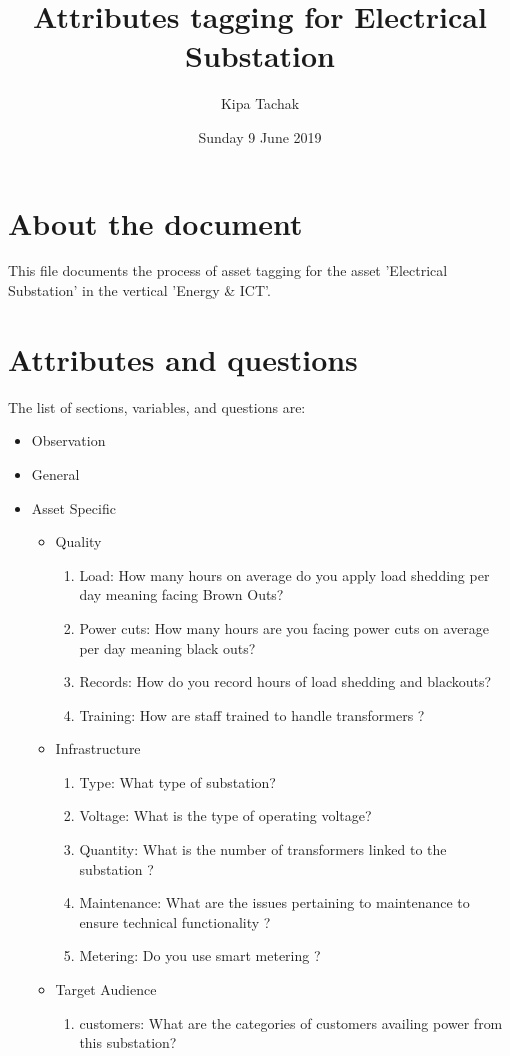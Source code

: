 \documentclass[oneside,twocolumn]{article}
\title{Attributes tagging for Electrical Substation}
\author{Kipa Tachak}
\date{Sunday  9 June 2019}
\begin{document}
\maketitle

\section{About the document}
This file documents the process of asset tagging for the asset 'Electrical Substation' in the
vertical 'Energy \& ICT'.

\section{Attributes and questions}
The list of sections, variables, and questions are:
    \begin{itemize}
    \item Observation
    \item General
    \item Asset Specific
    \begin{itemize}
\item Quality
\begin{enumerate}
\item Load: How many hours on average do you apply load shedding per day meaning facing Brown Outs?
\item Power cuts: How many hours are you facing power cuts on average per day meaning black outs?
\item Records: How do you record hours of load shedding and blackouts?
\item Training: How are staff trained to handle transformers ?
\end{enumerate}

\item Infrastructure
\begin{enumerate}
\item Type: What type of substation?
\item Voltage: What is the type of operating voltage? 
\item Quantity: What is the number of transformers linked to the substation ?
\item Maintenance: What are the issues pertaining to maintenance to ensure technical functionality ?
\item Metering: Do you use smart metering ?
\end{enumerate}

\item Target Audience
\begin{enumerate}
\item customers: What are the categories of customers availing power from this substation?
\end{enumerate}


\end{itemize}
\end{itemize}
\end{document}
